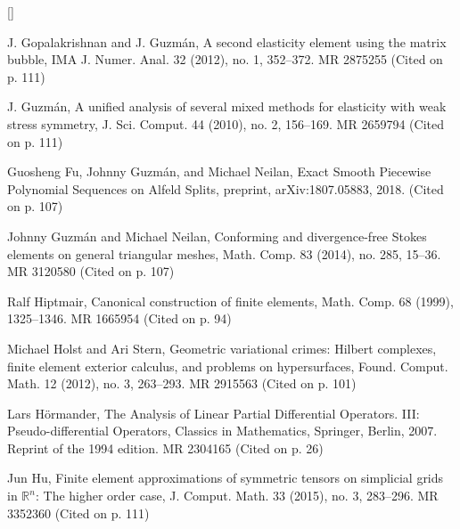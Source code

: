 \begin{list}{[]}{\setlength{\leftmargin}{2.7em}\setlength{\labelwidth}{2.2em}}
\item\label{bib:source-46}J. Gopalakrishnan and J. Guzmán, A second elasticity element using the matrix bubble, IMA J. Numer. Anal. 32 (2012), no. 1, 352–372. MR 2875255 (Cited on p. 111)

\item\label{bib:source-47}J. Guzmán, A unified analysis of several mixed methods for elasticity with weak stress symmetry, J. Sci. Comput. 44 (2010), no. 2, 156–169. MR 2659794 (Cited on p. 111)

\item\label{bib:source-48}Guosheng Fu, Johnny Guzmán, and Michael Neilan, Exact Smooth Piecewise Polynomial Sequences on Alfeld Splits, preprint, arXiv:1807.05883, 2018. (Cited on p. 107)

\item\label{bib:source-49}Johnny Guzmán and Michael Neilan, Conforming and divergence-free Stokes elements on general triangular meshes, Math. Comp. 83 (2014), no. 285, 15–36. MR 3120580 (Cited on p. 107)

\item\label{bib:source-50}Ralf Hiptmair, Canonical construction of finite elements, Math. Comp. 68 (1999), 1325–1346. MR 1665954 (Cited on p. 94)

\item\label{bib:source-51}Michael Holst and Ari Stern, Geometric variational crimes: Hilbert complexes, finite element exterior calculus, and problems on hypersurfaces, Found. Comput. Math. 12 (2012), no. 3, 263–293. MR 2915563 (Cited on p. 101)

\item\label{bib:source-52}Lars Hörmander, The Analysis of Linear Partial Differential Operators. III: Pseudo-differential Operators, Classics in Mathematics, Springer, Berlin, 2007. Reprint of the 1994 edition. MR 2304165 (Cited on p. 26)

\item\label{bib:source-53}Jun Hu, Finite element approximations of symmetric tensors on simplicial grids in $\mathbb R^n$: The higher order case, J. Comput. Math. 33 (2015), no. 3, 283–296. MR 3352360 (Cited on p. 111)


\end{list}
